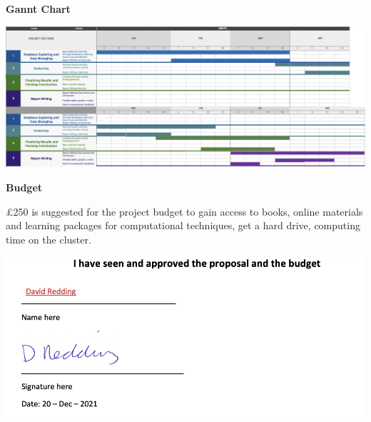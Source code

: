 \documentclass[11pt]{article}
\begin{document}
\noindent\textbf{Gannt Chart}

\includegraphics[scale=0.5]{test} 

\noindent\textbf{Budget}

£250 is suggested for the project budget to gain access to books, online materials and learning packages for computational 
techniques, get a hard drive, computing time on the cluster. 

\pagebreak
\includegraphics[scale=0.5]{sign}


\nolinenumbers

\end{document}
